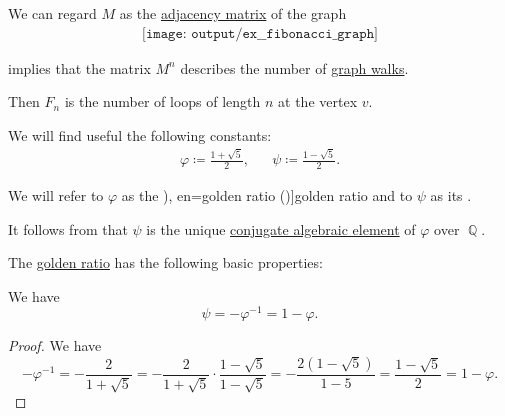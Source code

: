 \begin{example}
\begin{thmenum}
     We can regard \( M \) as the \hyperref[def:graph_adjacency_matrix]{adjacency matrix} of the graph
    \begin{equation}\label{eq:ex:fibonacci_matrix/graph}
      \begin{aligned}
        \texttt{[image: output/ex\_\_fibonacci\_graph]}
      \end{aligned}
    \end{equation}

     implies that the matrix \( M^n \) describes the number of \hyperref[def:graph_walk]{graph walks}.

    Then \( F_n \) is the number of loops of length \( n \) at the vertex \( v \).
  \end{thmenum}
\end{example}

\begin{definition}\label{def:golden_ratio}\mimprovised
  We will find useful the following constants:
  \begin{align*}
    \varphi \coloneqq \frac {1 + \sqrt 5} 2,
    &&
    \psi \coloneqq \frac {1 - \sqrt 5} 2.
  \end{align*}

  We will refer to \( \varphi \) as the \term[ru=золотое сечение (\cite[exerc. 7.18]{ГашковЧубариков2005СложностьВычисления}), en=golden ratio (\cite[35]{Knuth1997ArtVol1})]{golden ratio} and to \( \psi \) as its .
\end{definition}
\begin{comments}
  \item It follows from  that \( \psi \) is the unique \hyperref[def:conjugate_algebraic_element]{conjugate algebraic element} of \( \varphi \) over \( \BbbQ \).
\end{comments}

\begin{proposition}\label{thm:def:golden_ratio}
  The \hyperref[def:golden_ratio]{golden ratio} has the following basic properties:
  \begin{thmenum}
     We have
    \begin{equation}\label{eq:thm:def:golden_ratio/conjugate}
      \psi = -\varphi^{-1} = 1 - \varphi.
    \end{equation}
  \end{thmenum}
\end{proposition}
\begin{proof}
   We have
  \begin{equation*}
    -\varphi^{-1}
    =
    -\frac 2 {1 + \sqrt 5}
    =
    -\frac 2 {1 + \sqrt 5} \cdot \frac {1 - \sqrt 5} {1 - \sqrt 5}
    =
    -\frac {2(1 - \sqrt 5)} {1 - 5}
    =
    \frac {1 - \sqrt 5} 2
    =
    1 - \varphi.
  \end{equation*}
\end{proof}


